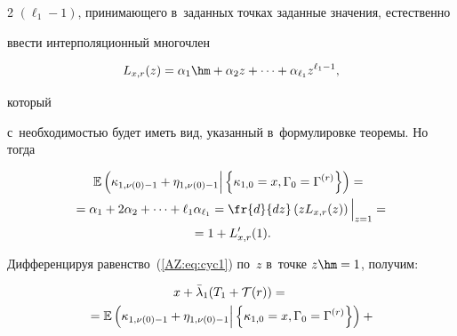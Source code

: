 \begin{multicols}{2}
$(\ell_1-1)$, принимающего в~заданных точках заданные значения, естественно

ввести интерполяционный многочлен

$$

L_{x,r}(z)=\alpha_1\hm+\alpha_2 z+\cdots+ \alpha_{\ell_1} z^{\ell_1-1},

$$

 который 

с~необходимостью будет иметь вид, указанный в~формулировке теоремы. Но тогда



\vspace*{-6pt}



\noindent

\begin{multline*}

   \! \mathbb{E} \left( \kappa_{1,\nu(0)-1}+\eta_{1,\nu(0)-1} \Big\vert

    \left\{\kappa_{1,0}=x,\Gamma_{0}=\Gamma^{(r)}\right\}\right)={}    \\ 

    {}=

    \alpha_1+2\alpha_2+\cdots+\ell_1 \alpha_{\ell_1} =

    \fr{d}{dz}\left(z L_{x,r}(z)\right)\Big|_{z=1} ={}\\

    {}= 1+L'_{x,r}(1).

\end{multline*}



\vspace*{-4pt}





Дифференцируя равенство~(\ref{AZ:eq:cyc1}) по~$z$ в~точке $z\hm=1$, получим:



\vspace*{-6pt}



\noindent

\begin{multline*}

  x+\bar\lambda_{1}(T_{1}+\mathcal T(r))={}\\

  {}=

  \mathbb E\left( \kappa_{1,\nu(0)-1}+\eta_{1,\nu(0)-1} \Big\vert 

 \left\{ \kappa_{1,0}=x,\Gamma_{0}=\Gamma^{(r)}\right\}\right)+{}\hspace*{-0.5pt}  \\ 


\end{multline*}
\end{multicols}
